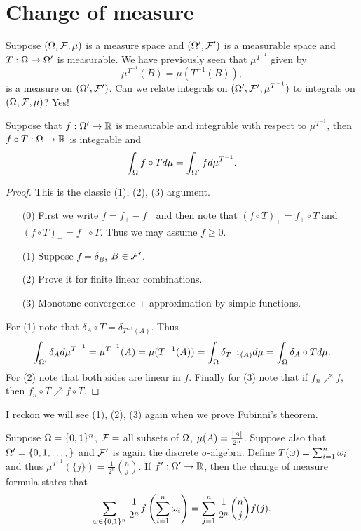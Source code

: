 \section{Change of measure}
Suppose $({{\Omega}},{\mathcal{F}},\mu)$ is a measure space and $({{\Omega}}',{\mathcal{F}}')$ is a measurable space and $T:{{\Omega}} \to {{\Omega}}'$ is measurable. We have previously seen that $\mu^{T^{-1}}$ given by
\[\mu^{T^{-1}}(B) = \mu(T^{-1}(B)), \]
is a measure on $({{\Omega}}',{\mathcal{F}}')$. Can we relate integrals on $({{\Omega}}',{\mathcal{F}}', \mu^{T^{-1}})$ to integrals on $({{\Omega}},{\mathcal{F}},\mu)$? Yes!
\begin{thrm}
    Suppose that $f: {{\Omega}}'\to {\mathbb R}$ is measurable and integrable with respect to $\mu^{T^{-1}}$, then $f \circ T:{{\Omega}} \to {\mathbb R}$ is integrable and 
    \[\int_{{\Omega}} f\circ T d\mu = \int_{{{\Omega}}'} f d\mu^{T^{-1}}. \]
\end{thrm}
\begin{proof}
    This is the classic (1), (2), (3) argument.
    \begin{enumerate}
        \item[(0)] First we write $f = f_+-f_-$ and then note that $(f\circ T)_+ = f_+\circ T$ and $(f\circ T)_- = f_- \circ T$. Thus we may assume $f \ge 0$.
        \item[(1)] Suppose $f = \delta_B$, $B \in {\mathcal{F}}'$.
        \item[(2)] Prove it for finite linear combinations.
        \item[(3)] Monotone convergence + approximation by simple functions.   
    \end{enumerate}
    For (1) note that $\delta_A \circ T = \delta_{T^{-1}(A)}$. Thus 
    \[\int_{{{\Omega}}'} \delta_A d\mu^{T^{-1}} = \mu^{T^{-1}}(A) = \mu(T^{-1}(A)) =\int_{{{\Omega}}} \delta_{T^{-1}(A)}d\mu = \int_{{{\Omega}}} \delta_A \circ Td\mu.  \]
    For (2) note that both sides are linear in $f$. Finally for (3) note that if $f_n \nearrow f$, then $f_n\circ T \nearrow f\circ T $.
\end{proof}
I reckon we will see (1), (2), (3) again when we prove Fubinni's theorem.
\begin{ex}
    Suppose ${{\Omega}} = \{0,1\}^n$, ${\mathcal{F}}=$ all subsets of ${{\Omega}}$, $\mu(A) = \frac{{\left\lvert A\right\rvert}}{2^n}$. Suppose also that ${{\Omega}}' = \{0,1,\ldots, \}$ and ${\mathcal{F}}'$ is again the discrete $\sigma$-algebra. Define $T({\omega}) = \sum_{i=1}^n {\omega}_i$ and thus $\mu^{T^{-1}}(\{j\})=\frac{1}{2^n}\binom{n}{j}$. If $f':{{\Omega}}' \to {\mathbb R}$, then the change of measure formula states that 
    \[\sum_{{\omega} \in \{0,1\}^n} \frac{1}{2^n} f\left(\sum_{i=1}^n {\omega}_i\right) = \sum_{j=1}^n \frac{1}{2^n}\binom{n}{j}f(j).\]

\end{ex}
